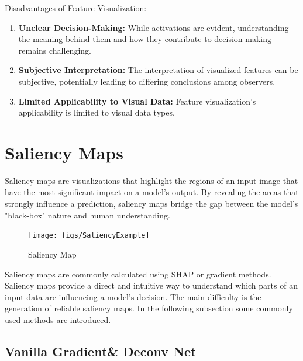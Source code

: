 Disadvantages of Feature Visualization:
\begin{enumerate}
	\item \textbf{Unclear Decision-Making:} While activations are evident, understanding the meaning behind them and how they contribute to decision-making remains challenging.
	\item \textbf{Subjective Interpretation:} The interpretation of visualized features can be subjective, potentially leading to differing conclusions among observers.
	\item \textbf{Limited Applicability to Visual Data:} Feature visualization's applicability is  limited to visual data types.
\end{enumerate}


\section{Saliency Maps}

Saliency maps are visualizations that highlight the regions of an input image that have the most significant impact on a model's output. By revealing the areas that strongly influence a prediction, saliency maps bridge the gap between the model's "black-box" nature and human understanding.

\begin{figure}[h!]
	\centering
	\texttt{[image: figs/SaliencyExample]}
	\caption{Saliency Map \cite{captum}}
	\label{fig:saliency}
\end{figure}

Saliency maps are commonly calculated using SHAP \cite{lundberg2017unified} or gradient methods. Saliency maps provide a direct and intuitive way to understand which parts of an input data are influencing a model's decision. The main difficulty is the generation of reliable saliency maps. In the following subsection some commonly used methods are introduced. 

\subsection{Vanilla Gradient\& Deconv Net}
\label{IG}

